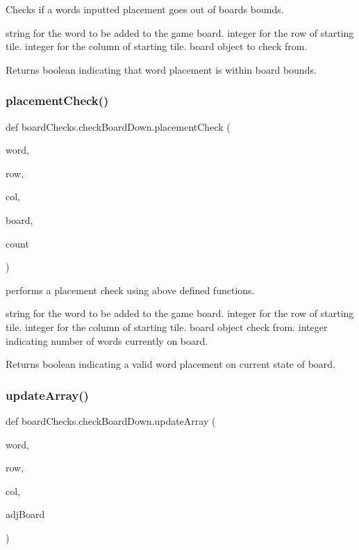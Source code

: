 Checks if a words inputted placement goes out of boards bounds. 

string for the word to be added to the game board.  integer for the row of starting tile.  integer for the column of starting tile.  board object to check from. \begin{DoxyReturn}{Returns}
boolean indicating that word placement is within board bounds. 
\end{DoxyReturn}
\mbox{\label{classboard_checks_1_1check_board_down_a9d61814308608ce9252dfc9c5f970c20}} 
\subsubsection{\texorpdfstring{placement\+Check()}{placementCheck()}}
{\footnotesize\ttfamily def board\+Checks.\+check\+Board\+Down.\+placement\+Check (\begin{DoxyParamCaption}\item[{}]{word,  }\item[{}]{row,  }\item[{}]{col,  }\item[{}]{board,  }\item[{}]{count }\end{DoxyParamCaption})}



performs a placement check using above defined functions. 

string for the word to be added to the game board.  integer for the row of starting tile.  integer for the column of starting tile.  board object check from.  integer indicating number of words currently on board. \begin{DoxyReturn}{Returns}
boolean indicating a valid word placement on current state of board. 
\end{DoxyReturn}
\mbox{\label{classboard_checks_1_1check_board_down_a1912bf117f666274ccb2e2fcd6e150d8}} 
\subsubsection{\texorpdfstring{update\+Array()}{updateArray()}}
{\footnotesize\ttfamily def board\+Checks.\+check\+Board\+Down.\+update\+Array (\begin{DoxyParamCaption}\item[{}]{word,  }\item[{}]{row,  }\item[{}]{col,  }\item[{}]{adj\+Board }\end{DoxyParamCaption})}



